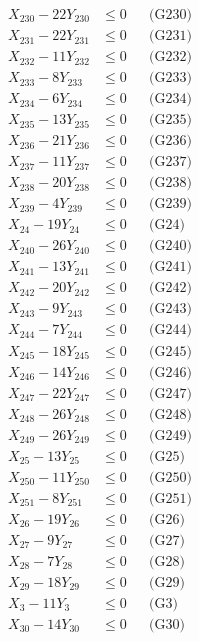 \documentclass[a4paper,10pt]{article}
\begin{document}
{\begin{align}
X_{230} - 22Y_{230} &\leq 0 && \text{(G230)} \\
X_{231} - 22Y_{231} &\leq 0 && \text{(G231)} \\
X_{232} - 11Y_{232} &\leq 0 && \text{(G232)} \\
X_{233} - 8Y_{233} &\leq 0 && \text{(G233)} \\
X_{234} - 6Y_{234} &\leq 0 && \text{(G234)} \\
X_{235} - 13Y_{235} &\leq 0 && \text{(G235)} \\
X_{236} - 21Y_{236} &\leq 0 && \text{(G236)} \\
X_{237} - 11Y_{237} &\leq 0 && \text{(G237)} \\
X_{238} - 20Y_{238} &\leq 0 && \text{(G238)} \\
X_{239} - 4Y_{239} &\leq 0 && \text{(G239)} \\
X_{24} - 19Y_{24} &\leq 0 && \text{(G24)} \\
X_{240} - 26Y_{240} &\leq 0 && \text{(G240)} \\
X_{241} - 13Y_{241} &\leq 0 && \text{(G241)} \\
\allowbreak
X_{242} - 20Y_{242} &\leq 0 && \text{(G242)} \\
X_{243} - 9Y_{243} &\leq 0 && \text{(G243)} \\
X_{244} - 7Y_{244} &\leq 0 && \text{(G244)} \\
X_{245} - 18Y_{245} &\leq 0 && \text{(G245)} \\
X_{246} - 14Y_{246} &\leq 0 && \text{(G246)} \\
X_{247} - 22Y_{247} &\leq 0 && \text{(G247)} \\
X_{248} - 26Y_{248} &\leq 0 && \text{(G248)} \\
X_{249} - 26Y_{249} &\leq 0 && \text{(G249)} \\
X_{25} - 13Y_{25} &\leq 0 && \text{(G25)} \\
X_{250} - 11Y_{250} &\leq 0 && \text{(G250)} \\
X_{251} - 8Y_{251} &\leq 0 && \text{(G251)} \\
X_{26} - 19Y_{26} &\leq 0 && \text{(G26)} \\
X_{27} - 9Y_{27} &\leq 0 && \text{(G27)} \\
X_{28} - 7Y_{28} &\leq 0 && \text{(G28)} \\
X_{29} - 18Y_{29} &\leq 0 && \text{(G29)} \\
X_{3} - 11Y_{3} &\leq 0 && \text{(G3)} \\
X_{30} - 14Y_{30} &\leq 0 && \text{(G30)} \\

\end{align}}
\end{document}
